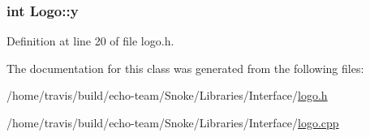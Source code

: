 \hypertarget{class_logo_a33846b1b3ac0da8180c888fb9a1680f6}{
\subsubsection[{y}]{\setlength{\rightskip}{0pt plus 5cm}int Logo\-::y\hspace{0.3cm}{\ttfamily [private]}}}\label{class_logo_a33846b1b3ac0da8180c888fb9a1680f6}


Definition at line 20 of file logo.\-h.



The documentation for this class was generated from the following files\-:\begin{DoxyCompactItemize}
\item 
/home/travis/build/echo-\/team/\-Snoke/\-Libraries/\-Interface/\hyperlink{logo_8h}{logo.\-h}\item 
/home/travis/build/echo-\/team/\-Snoke/\-Libraries/\-Interface/\hyperlink{logo_8cpp}{logo.\-cpp}\end{DoxyCompactItemize}
